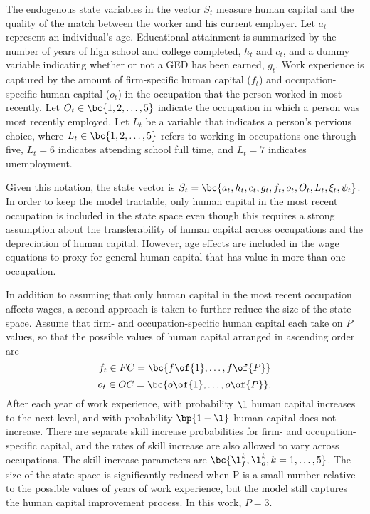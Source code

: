 \documentclass[12pt]{article}
\theoremstyle{definition}
\begin{document}
The endogenous state variables in the vector $S_t$ measure human capital and the quality of the match between the worker and his current employer. Let $a_t$ represent an individual's age. Educational attainment is summarized by the number of years of high school and college completed, $h_t$ and $c_t$, and a dummy variable indicating whether or not a GED has been earned, $g_t$. Work experience is captured by the amount of firm-specific human capital ($f_t$) and occupation-specific human capital ($o_t$) in the occupation that the person worked in most recently. Let $O_t \in \bc{1, 2, \ldots, 5}$ indicate the occupation in which a person was most recently employed. Let $L_t$ be a variable that indicates a person's pervious choice, where $L_t \in \bc{1, 2, \ldots, 5}$ refers to working in occupations one through five, $L_t = 6$ indicates attending school full time, and $L_t = 7$ indicates unemployment.

Given this notation, the state vector is $S_t = \bc{a_t, h_t, c_t, g_t, f_t, o_t, O_t, L_t, \xi_t, \psi_t}$. In order to keep the model tractable, only human capital in the most recent occupation is included in the state space even though this requires a strong assumption about the transferability of human capital across occupations and the depreciation of human capital. However, age effects are included in the wage equations to proxy for general human capital that has value in more than one occupation.

In addition to assuming that only human capital in the most recent occupation affects wages, a second approach is taken to further reduce the size of the state space. Assume that firm- and occupation-specific human capital each take on $P$ values, so that the possible values of human capital arranged in ascending order are
$$f_t \in FC = \bc{f\of{1}, \ldots, f\of{P}}$$
$$o_t \in OC = \bc{o\of{1}, \ldots, o\of{P}}.$$
After each year of work experience, with probability $\l$ human capital increases to the next level, and with probability $\bp{1-\l}$ human capital does not increase. There are separate skill increase probabilities for firm- and occupation-specific capital, and the rates of skill increase are also allowed to vary across occupations. The skill increase parameters are $\bc{\l_f^k, \l_o^k, k = 1, \ldots, 5}$. The size of the state space is significantly reduced when P is a small number relative to the possible values of years of work experience, but the model still captures the human capital improvement process. In this work, $P = 3$.
\end{document}
